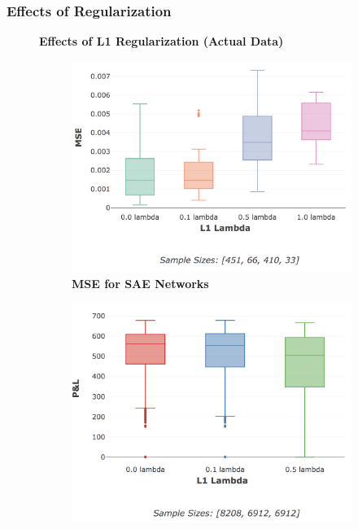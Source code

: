 \documentclass[a4paper,11pt,oneside]{article}
\theoremstyle{plain}
\theoremstyle{definition}
\begin{document}
	
	
	
	
	
	\subsubsection{Effects of Regularization}
	
	
	\begin{figure}[H]
		\centering
		\textbf{Effects of L1 Regularization (Actual Data)}
		\begin{subfigure}{.5\textwidth}
			\centering 
			\includegraphics[scale=0.3]{images/results/network/reg/actual_mse_reg.png}
			\caption{\textbf{MSE for SAE Networks} 
				\newline }
			\label{figure-actual_mse_reg}
		\end{subfigure}%
		\begin{subfigure}{.5\textwidth}
			\centering 
			\includegraphics[scale=0.3]{images/results/network/reg/actual_pl_reg.png}

\end{subfigure}
\end{figure}
\end{document}

